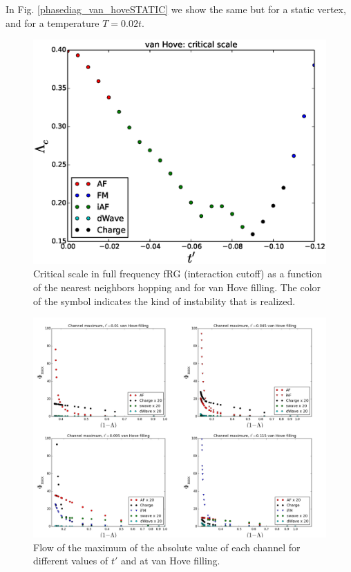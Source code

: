 In Fig. \ref{phasediag_van_hoveSTATIC} we show the same but for a static vertex, and for a temperature $T= 0.02t$. 
\begin{figure}
\includegraphics[scale=0.7]{vanHove_scan_critical_lambda_phi.eps}
\caption{Critical scale in full frequency fRG (interaction cutoff) as a function of the nearest neighbors hopping and for van Hove filling. The color of the symbol indicates the kind of instability that is realized.  } \label{phasediag_van_hove}

\end{figure}


\begin{figure}
\includegraphics[scale=0.32,angle = 90]{images/vanhovelam.png}
\caption{Flow of the maximum of the absolute value of each channel for different values of $t'$ and at van Hove filling.
} 
\label{lamvan} 
\end{figure}


